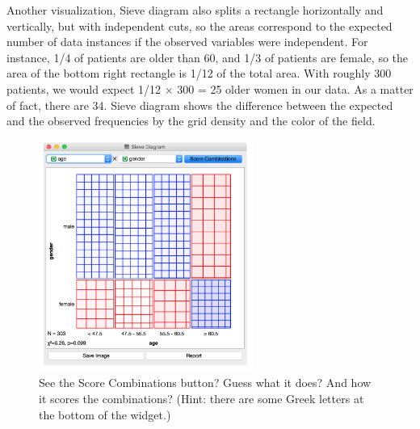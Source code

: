 Another visualization, Sieve diagram also splits a rectangle horizontally and vertically, but with independent cuts, so the areas correspond to the expected number of data instances if the observed variables were independent. For instance, 1/4 of patients are older than 60, and 1/3 of patients are female, so the area of the bottom right rectangle is 1/12 of the total area. With roughly 300 patients, we would expect 1/12 × 300 = 25 older women in our data. As a matter of fact, there are 34. Sieve diagram shows the difference between the expected and the observed frequencies by the grid density and the color of the field.

\begin{figure}
  \flushright
  \includegraphics[width=70mm]{graphics/ch-basic_data_exploration/basic_data_exploration-fig7.png}
  \caption{See the Score Combinations button? Guess what it does? And how it scores the combinations? (Hint: there are some Greek letters at the bottom of the widget.)}
  \label{fig:basic_data_exploration-fig7}
\end{figure}